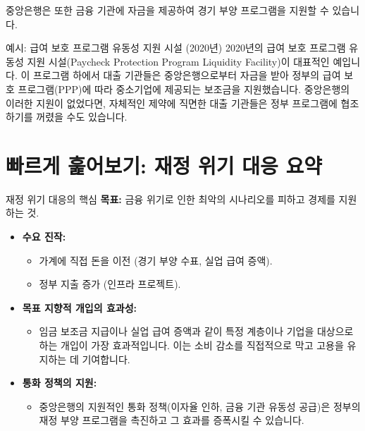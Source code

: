 \documentclass[11pt,a4paper]{article}
\theoremstyle{definition}
\begin{document}
중앙은행은 또한 금융 기관에 자금을 제공하여 경기 부양 프로그램을 지원할 수 있습니다.

\begin{examplebox}{예시: 급여 보호 프로그램 유동성 지원 시설 (2020년)}
    2020년의 급여 보호 프로그램 유동성 지원 시설(Paycheck Protection Program Liquidity Facility)이 대표적인 예입니다. 이 프로그램 하에서 대출 기관들은 중앙은행으로부터 자금을 받아 정부의 급여 보호 프로그램(PPP)에 따라 중소기업에 제공되는 보조금을 지원했습니다. 중앙은행의 이러한 지원이 없었다면, 자체적인 제약에 직면한 대출 기관들은 정부 프로그램에 협조하기를 꺼렸을 수도 있습니다.
\end{examplebox}

\newpage
\section{빠르게 훑어보기: 재정 위기 대응 요약}

\begin{summarybox}{재정 위기 대응의 핵심}
    \textbf{목표:} 금융 위기로 인한 최악의 시나리오를 피하고 경제를 지원하는 것.
\end{summarybox}

\begin{tcolorbox}[mybox={세 가지 주요 재정 대응 방안}]
    \begin{itemize}
        \item \textbf{수요 진작:}
        \begin{itemize}
            \item 가계에 직접 돈을 이전 (경기 부양 수표, 실업 급여 증액).
            \item 정부 지출 증가 (인프라 프로젝트).
        \end{itemize}
        \item \textbf{목표 지향적 개입의 효과성:}
        \begin{itemize}
            \item 임금 보조금 지급이나 실업 급여 증액과 같이 특정 계층이나 기업을 대상으로 하는 개입이 가장 효과적입니다. 이는 소비 감소를 직접적으로 막고 고용을 유지하는 데 기여합니다.
        \end{itemize}
        \item \textbf{통화 정책의 지원:}
        \begin{itemize}
            \item 중앙은행의 지원적인 통화 정책(이자율 인하, 금융 기관 유동성 공급)은 정부의 재정 부양 프로그램을 촉진하고 그 효과를 증폭시킬 수 있습니다.
        \end{itemize}
    \end{itemize}
\end{tcolorbox}
\end{document}
